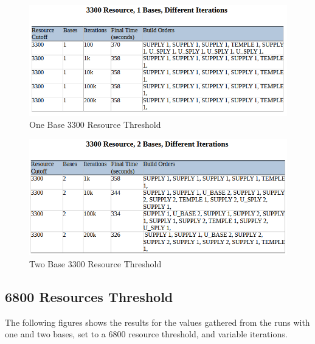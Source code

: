 \documentclass[a4paper, 12pt, english]{article}
\begin{document}
 \begin{figure}[!ht]
 			\begin{center}
				\includegraphics[width=150mm,scale=1.0]{3300r1b.png}
			\end{center}
       		\caption{\label{fig:Lowpass}One Base 3300 Resource Threshold}
 \end{figure}


 \begin{figure}[!ht]
 			\begin{center}
				\includegraphics[width=150mm,scale=1.0]{3300r2b.png}
			\end{center}
       		\caption{\label{fig:Lowpass}Two Base 3300 Resource Threshold}
 \end{figure}

\newpage
\subsection{6800 Resources Threshold}

The following figures shows the results for the values gathered from the runs with one and two bases, set to a 6800 resource threshold, and variable iterations.
\end{document}
